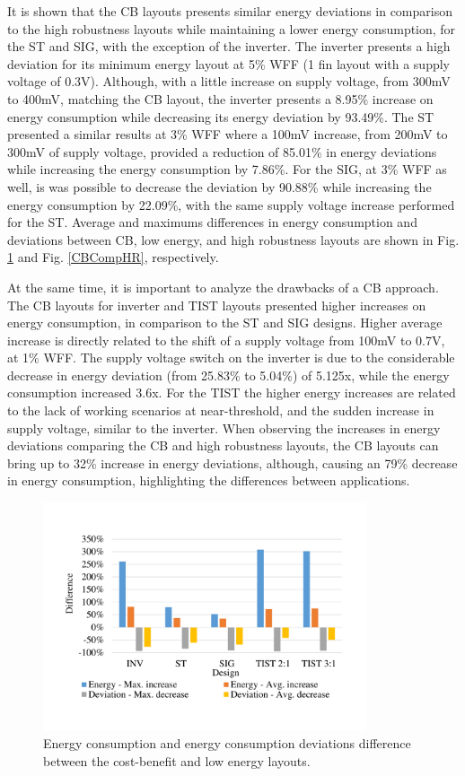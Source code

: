 \documentclass[diss,pgmicro,english]{iiufrgs}
\begin{document}
It is shown that the CB layouts presents similar energy deviations in comparison to the high robustness layouts while maintaining a lower energy consumption, for the ST and SIG, with the exception of the inverter. The inverter presents a high deviation for its minimum energy layout at 5\% WFF (1 fin layout with a supply voltage of 0.3V). Although, with a little increase on supply voltage, from 300mV to 400mV, matching the CB layout, the inverter presents a 8.95\% increase on energy consumption while decreasing its energy deviation by 93.49\%. The ST presented a similar results at 3\% WFF where a 100mV increase, from 200mV to 300mV of supply voltage, provided a reduction of 85.01\% in energy deviations while increasing the energy consumption by 7.86\%. For the SIG, at 3\% WFF as well, is was possible to decrease the deviation by 90.88\% while increasing the energy consumption by 22.09\%, with the same supply voltage increase performed for the ST. Average and maximums differences in energy consumption and deviations between CB, low energy, and high robustness layouts are shown in Fig. \ref{CBCompLE} and Fig. \ref{CBCompHR}, respectively.

    At the same time, it is important to analyze the drawbacks of a CB approach. The CB layouts for inverter and TIST layouts presented higher increases on energy consumption, in comparison to the ST and SIG designs. Higher average increase is directly related to the shift of a supply voltage from 100mV to 0.7V, at 1\% WFF. The supply voltage switch on the inverter is due to the considerable decrease in energy deviation (from 25.83\% to 5.04\%) of 5.125x, while the energy consumption increased 3.6x. For the TIST the higher energy increases are related to the lack of working scenarios at near-threshold, and the sudden increase in supply voltage, similar to the inverter. When observing the increases in energy deviations comparing the CB and high robustness layouts, the CB layouts can bring up to 32\% increase in energy deviations, although, causing an 79\% decrease in energy consumption, highlighting the differences between applications.

\begin{figure}[t]
	\centering
       	\caption{Energy consumption and energy consumption deviations difference between the cost-benefit and low energy layouts. \label{CBCompLE}}        	  \includegraphics[width=0.85\textwidth, trim={1.25cm 2cm 2cm 3cm}, clip]{compCB-LE.pdf}
\end{figure}
\end{document}

